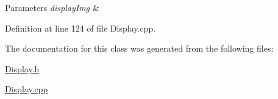 \begin{DoxyParams}{Parameters}
{\em displayImg} & \\
\hline
\end{DoxyParams}


Definition at line 124 of file Display.cpp.



The documentation for this class was generated from the following files:\begin{DoxyCompactItemize}
\item 
\hyperlink{_display_8h}{Display.h}\item 
\hyperlink{_display_8cpp}{Display.cpp}\end{DoxyCompactItemize}
